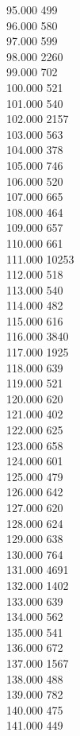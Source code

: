 { 95.000	499 \\
 96.000	580 \\
 97.000	599 \\
 98.000	2260 \\
 99.000	702 \\
 100.000	521 \\
 101.000	540 \\
 102.000	2157 \\
 103.000	563 \\
 104.000	378 \\
 105.000	746 \\
 106.000	520 \\
 107.000	665 \\
 108.000	464 \\
 109.000	657 \\
 110.000	661 \\
 111.000	10253 \\
 112.000	518 \\
 113.000	540 \\
 114.000	482 \\
 115.000	616 \\
 116.000	3840 \\
 117.000	1925 \\
 118.000	639 \\
 119.000	521 \\
 120.000	620 \\
 121.000	402 \\
 122.000	625 \\
 123.000	658 \\
 124.000	601 \\
 125.000	479 \\
 126.000	642 \\
 127.000	620 \\
 128.000	624 \\
 129.000	638 \\
 130.000	764 \\
 131.000	4691 \\
 132.000	1402 \\
 133.000	639 \\
 134.000	562 \\
 135.000	541 \\
 136.000	672 \\
 137.000	1567 \\
 138.000	488 \\
 139.000	782 \\
 140.000	475 \\
 141.000	449 \\
}
